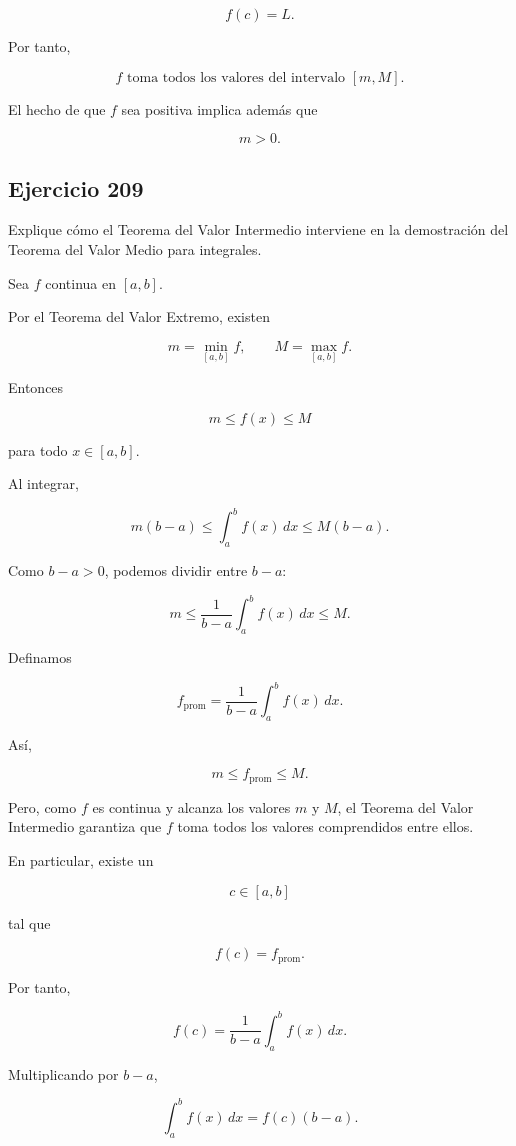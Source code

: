 \documentclass[12pt]{article}
\begin{document}
\[
f(c)=L.
\]

Por tanto,

\[
\boxed{
f \text{ toma todos los valores del intervalo }[m,M]
}.
\]

El hecho de que \(f\) sea positiva implica además que

\[
m>0.
\]

\subsection*{Ejercicio 209}

Explique cómo el Teorema del Valor Intermedio interviene en la
demostración del Teorema del Valor Medio para integrales.

Sea \(f\) continua en \([a,b]\).

Por el Teorema del Valor Extremo, existen

\[
m=\min_{[a,b]}f,
\qquad
M=\max_{[a,b]}f.
\]

Entonces

\[
m\leq f(x)\leq M
\]

para todo \(x\in[a,b]\).

Al integrar,

\[
m(b-a)
\leq
\int_a^b f(x)\,dx
\leq
M(b-a).
\]

Como \(b-a>0\), podemos dividir entre \(b-a\):

\[
m
\leq
\frac{1}{b-a}
\int_a^b f(x)\,dx
\leq
M.
\]

Definamos

\[
f_{\mathrm{prom}}
=
\frac{1}{b-a}
\int_a^b f(x)\,dx.
\]

Así,

\[
m\leq f_{\mathrm{prom}}\leq M.
\]

Pero, como \(f\) es continua y alcanza los valores \(m\) y \(M\), el
Teorema del Valor Intermedio garantiza que \(f\) toma todos los valores
comprendidos entre ellos.

En particular, existe un

\[
c\in[a,b]
\]

tal que

\[
f(c)=f_{\mathrm{prom}}.
\]

Por tanto,

\[
f(c)
=
\frac{1}{b-a}
\int_a^b f(x)\,dx.
\]

Multiplicando por \(b-a\),

\[
\boxed{
\int_a^b f(x)\,dx
=
f(c)(b-a)
}.
\]
\end{document}
